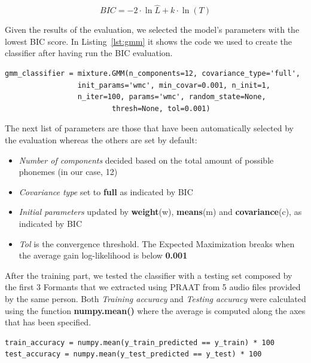 \begin{equation}
\label{eq:bic}
	 BIC = -2 \cdot \ln{\hat L} + k \cdot \ln(T)
\end{equation}

\noindent Given the results of the evaluation, we selected the model's parameters with the lowest BIC score. In Listing~\ref{lst:gmm} it shows the code we used to create the classifier after having run the BIC evaluation.

\begin{lstlisting}[caption={Parameters of GMM classifier},label={lst:gmm}, style=BashInputStyle]
gmm_classifier = mixture.GMM(n_components=12, covariance_type='full',
			     init_params='wmc', min_covar=0.001, n_init=1,
			     n_iter=100, params='wmc', random_state=None,
	                     thresh=None, tol=0.001)
\end{lstlisting}

\clearpage

\noindent The next list of parameters are those that have been automatically selected by the evaluation whereas the others are set by default:

\begin{itemize}
	\item \textit{Number of components} decided based on the total amount of possible phonemes (in our case, 12)
	\item \textit{Covariance type} set to \textbf{full} as indicated by BIC
	\item \textit{Initial parameters} updated by \textbf{weight}(w), \textbf{means}(m) and \textbf{covariance}(c), as indicated by BIC
	\item \textit{Tol} is the convergence threshold. The Expected Maximization breaks when the average gain log-likelihood is below \textbf{0.001}
\end{itemize}

\noindent After the training part, we tested the classifier with a testing set composed by the first 3 Formants that we extracted using PRAAT from 5 audio files provided by the same person. Both \textit{Training accuracy} and \textit{Testing accuracy} were calculated using the function \textbf{numpy.mean()} where the average is computed along the axes that has been specified.

\begin{lstlisting}[caption={Code for accuracy estimation of training and testing set},label={lst:accuracy}, style=BashInputStyle]
train_accuracy = numpy.mean(y_train_predicted == y_train) * 100
test_accuracy = numpy.mean(y_test_predicted == y_test) * 100
\end{lstlisting}

